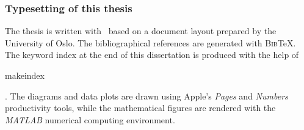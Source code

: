 \null 
\vfill
\begin{footnotesize}\subsubsection*{Typesetting of this thesis}

The thesis is written with \LaTeXe \ based on a document layout prepared by the University of Oslo. The bibliographical references are generated with \textsc{Bib}\negthinspace\TeX.  The keyword index at the end of this dissertation is produced with the help of \begin{scriptsize}\textsf{makeindex}\end{scriptsize}. The diagrams and data plots are drawn using Apple's \textit{Pages} and \textit{Numbers} productivity tools, while the mathematical figures are rendered with the \textit{MATLAB} numerical computing environment.\end{footnotesize}
